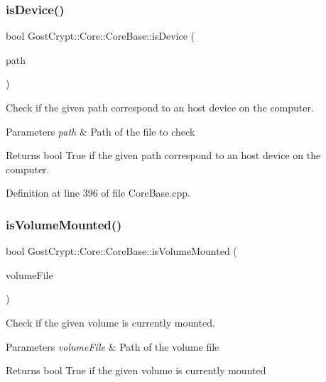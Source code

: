 \subsubsection{\texorpdfstring{is\+Device()}{isDevice()}}
{\footnotesize\ttfamily bool Gost\+Crypt\+::\+Core\+::\+Core\+Base\+::is\+Device (\begin{DoxyParamCaption}\item[{Q\+String}]{path }\end{DoxyParamCaption})\hspace{0.3cm}{\ttfamily [protected]}}



Check if the given path correspond to an host device on the computer. 


\begin{DoxyParams}{Parameters}
{\em path} & Path of the file to check \\
\hline
\end{DoxyParams}
\begin{DoxyReturn}{Returns}
bool True if the given path correspond to an host device on the computer. 
\end{DoxyReturn}


Definition at line 396 of file Core\+Base.\+cpp.

\mbox{\label{class_gost_crypt_1_1_core_1_1_core_base_a25b5689e9d93d04e6d1474a4415a92c1}} 
\subsubsection{\texorpdfstring{is\+Volume\+Mounted()}{isVolumeMounted()}}
{\footnotesize\ttfamily bool Gost\+Crypt\+::\+Core\+::\+Core\+Base\+::is\+Volume\+Mounted (\begin{DoxyParamCaption}\item[{Q\+File\+Info}]{volume\+File }\end{DoxyParamCaption})\hspace{0.3cm}{\ttfamily [protected]}}



Check if the given volume is currently mounted. 


\begin{DoxyParams}{Parameters}
{\em volume\+File} & Path of the volume file \\
\hline
\end{DoxyParams}
\begin{DoxyReturn}{Returns}
bool True if the given volume is currently mounted 
\end{DoxyReturn}


